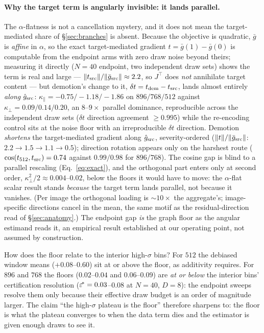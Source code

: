 \paragraph{Why the target term is angularly invisible: it lands
parallel.}
The $\alpha$-flatness is not a cancellation mystery, and it does not
mean the target-mediated share of \S\ref{sec:branches} is absent.
Because the objective is quadratic, $\bar g$ is \emph{affine} in
$\alpha$, so the exact target-mediated gradient
$t = \bar g(1) - \bar g(0)$ is computable from the endpoint arms with
zero draw noise beyond theirs; measuring it directly ($N{=}40$
endpoint, two independent draw sets) shows the term is real and large
--- $\|t_{\mathrm{src}}\| / \|\bar g_{\mathrm{src}}\| \approx 2.2$, so $J^{\!\top}$
does \emph{not} annihilate target content --- but demotion's change to
it, $\delta t = t_{\mathrm{dem}} - t_{\mathrm{src}}$, lands almost entirely
\emph{along} $\hat g_{\mathrm{src}}$: $\kappa_\parallel = -0.75 / -1.18 /
-1.86$ on $896/768/512$ against $\kappa_\perp = 0.09 / 0.14 / 0.20$,
an $8$--$9\times$ parallel dominance, reproducible across the
independent draw sets ($\delta t$ direction agreement $\ge 0.995$)
while the re-encoding control sits at the noise floor with an
irreproducible $\delta t$ direction. Demotion \emph{shortens} the
target-mediated gradient along $\hat g_{\mathrm{src}}$, severity-ordered
($\|t\| / \|\bar g_{\mathrm{src}}\|$: $2.2 \to 1.5 \to 1.1 \to 0.5$);
direction rotation appears only on the harshest route
($\cos(t_{512}, t_{\mathrm{src}}) = 0.74$ against $0.99/0.98$ for $896/768$).
The cosine gap is blind to a parallel rescaling (Eq.~\ref{eq:exact}),
and the orthogonal part enters only at second order,
$\kappa_\perp^2 / 2 \approx 0.004$--$0.02$, below the floors it would
have to move: the $\alpha$-flat scalar result stands \emph{because}
the target term lands parallel, not because it vanishes. (Per image
the orthogonal loading is ${\sim}10\times$ the aggregate's;
image-specific directions cancel in the mean, the same motif as the
residual-direction read of \S\ref{sec:anatomy}.) The endpoint gap
\emph{is} the graph floor as the angular estimand reads it, an
empirical result established at our operating point, not assumed by
construction.

How does the floor relate to the interior high-$\sigma$ bins? For $512$
the debiased window means ($+0.08$--$0.60$) sit at or above the floor,
as additivity requires. For $896$ and $768$ the floors ($0.02$--$0.04$
and $0.06$--$0.09$) are \emph{at or below} the interior bins'
certification resolution ($\varepsilon^{\!*} = 0.03$--$0.08$ at $N{=}40$,
$D{=}8$): the endpoint sweeps resolve them only because their effective
draw budget is an order of magnitude larger. The claim ``the
high-$\sigma$ plateau is the floor'' therefore sharpens to: the floor is
what the plateau converges to when the data term dies and the estimator
is given enough draws to see it.

